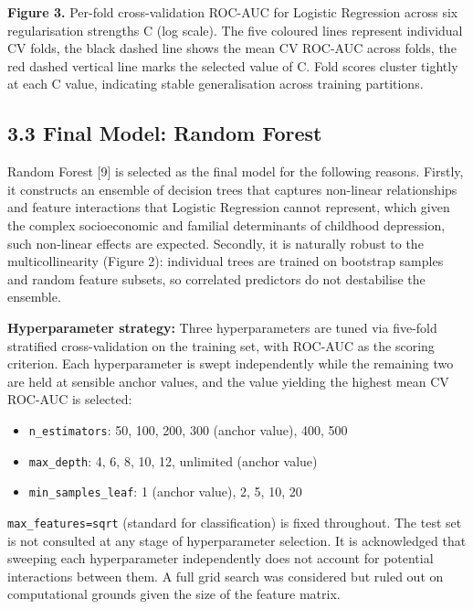 \documentclass[11pt]{article}
\providecommand{\tightlist}{%
      \setlength{\itemsep}{0pt}\setlength{\parskip}{0pt}}
\begin{document}
    \textbf{Figure 3.} Per-fold cross-validation ROC-AUC for Logistic
Regression across six regularisation strengths C (log scale). The five
coloured lines represent individual CV folds, the black dashed line
shows the mean CV ROC-AUC across folds, the red dashed vertical line
marks the selected value of C. Fold scores cluster tightly at each C
value, indicating stable generalisation across training partitions.

    \hypertarget{final-model-random-forest}{%
\subsection{3.3 Final Model: Random
Forest}\label{final-model-random-forest}}

Random Forest {[}9{]} is selected as the final model for the following
reasons. Firstly, it constructs an ensemble of decision trees that
captures non-linear relationships and feature interactions that Logistic
Regression cannot represent, which given the complex socioeconomic and
familial determinants of childhood depression, such non-linear effects
are expected. Secondly, it is naturally robust to the multicollinearity
(Figure 2): individual trees are trained on bootstrap samples and random
feature subsets, so correlated predictors do not destabilise the
ensemble.

\textbf{Hyperparameter strategy:} Three hyperparameters are tuned via
five-fold stratified cross-validation on the training set, with ROC-AUC
as the scoring criterion. Each hyperparameter is swept independently
while the remaining two are held at sensible anchor values, and the
value yielding the highest mean CV ROC-AUC is selected:

\begin{itemize}
\tightlist
\item
  \texttt{n\_estimators}: 50, 100, 200, 300 (anchor value), 400, 500
\item
  \texttt{max\_depth}: 4, 6, 8, 10, 12, unlimited (anchor value)
\item
  \texttt{min\_samples\_leaf}: 1 (anchor value), 2, 5, 10, 20
\end{itemize}

\texttt{max\_features=\textquotesingle{}sqrt\textquotesingle{}}
(standard for classification) is fixed throughout. The test set is not
consulted at any stage of hyperparameter selection. It is acknowledged
that sweeping each hyperparameter independently does not account for
potential interactions between them. A full grid search was considered
but ruled out on computational grounds given the size of the feature
matrix.
\end{document}
